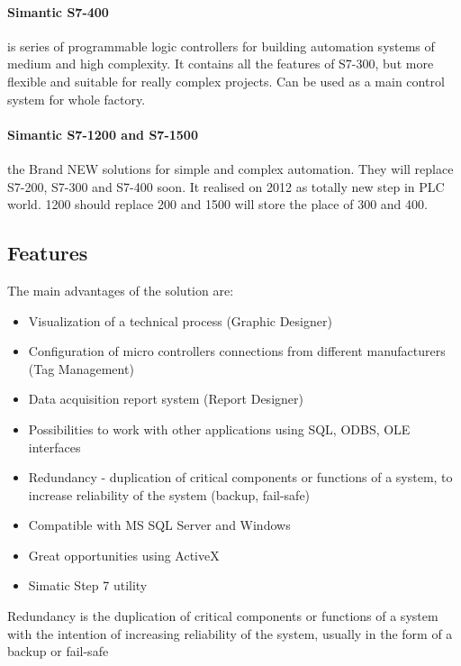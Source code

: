 \documentclass[english]{article}
\begin{document}
\paragraph{Simantic S7-400}
 is series of programmable logic controllers for building automation systems of medium and high complexity. It contains all the features of S7-300, but more flexible and suitable for really complex projects. Can be used as a main control system for whole factory.

\paragraph{Simantic S7-1200 and S7-1500}
the Brand NEW solutions for simple and complex automation. They will replace S7-200, S7-300 and S7-400 soon. It realised on 2012 as totally new step in PLC world. 1200 should replace 200 and 1500 will store the place of 300 and 400.
\subsection{Features}
The main advantages of the solution are:
\begin{itemize}
\item Visualization of a technical process (Graphic Designer)
\item Configuration of micro controllers connections from different manufacturers (Tag Management)
\item Data acquisition report system (Report Designer)
\item Possibilities to work with other applications using SQL, ODBS, OLE interfaces
\item Redundancy - duplication of critical components or functions of a system, to  increase reliability  of the system (backup, fail-safe)
\item Compatible with MS SQL Server and Windows
\item Great opportunities using ActiveX
\item Simatic Step 7 utility
\end{itemize}

Redundancy is the duplication of critical components or functions of a system with the intention of increasing reliability of the system, usually in the form of a backup or fail-safe
\newpage
\end{document}
